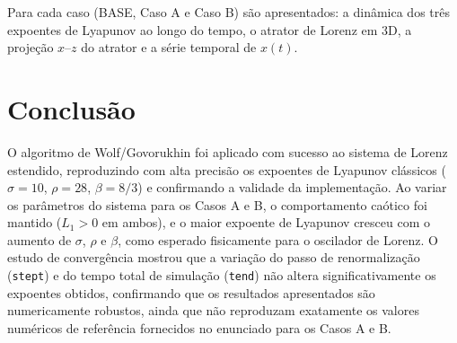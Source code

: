 \documentclass[a4paper,11pt]{article}
\begin{document}
Para cada caso (BASE, Caso A e Caso B) são apresentados: a dinâmica dos
três expoentes de Lyapunov ao longo do tempo, o atrator de Lorenz em 3D,
a projeção $x$--$z$ do atrator e a série temporal de $x(t)$.



\section{Conclusão}

O algoritmo de Wolf/Govorukhin foi aplicado com sucesso ao sistema de
Lorenz estendido, reproduzindo com alta precisão os expoentes de
Lyapunov clássicos ($\sigma=10$, $\rho=28$, $\beta=8/3$) e confirmando
a validade da implementação. Ao variar os parâmetros do sistema para os
Casos A e B, o comportamento caótico foi mantido ($L_1>0$ em ambos), e
o maior expoente de Lyapunov cresceu com o aumento de $\sigma$, $\rho$
e $\beta$, como esperado fisicamente para o oscilador de Lorenz. O
estudo de convergência mostrou que a variação do passo de
renormalização (\texttt{stept}) e do tempo total de simulação
(\texttt{tend}) não altera significativamente os expoentes obtidos,
confirmando que os resultados apresentados são numericamente robustos,
ainda que não reproduzam exatamente os valores numéricos de referência
fornecidos no enunciado para os Casos A e B.
\end{document}
